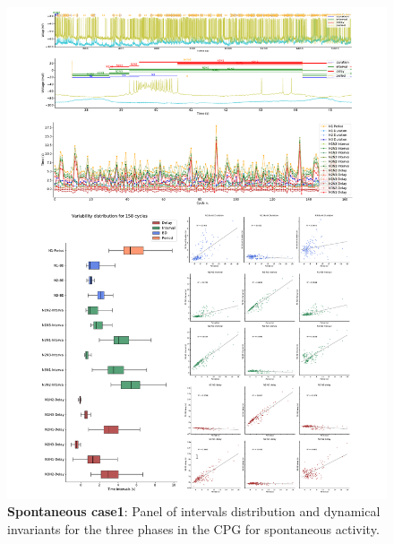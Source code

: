 \begin{figure}[htbp]
	\centering
	\includegraphics[width=1.1\textwidth]{./invariants/data/SUSSEX/prep1/images/3phases/panel_with_intervals.pdf}
	\caption{\textbf{Spontaneous case1}: Panel of intervals distribution and dynamical invariants for the three phases in the CPG for spontaneous activity.}
	\label{fig:prep1 invariants}
\end{figure}


